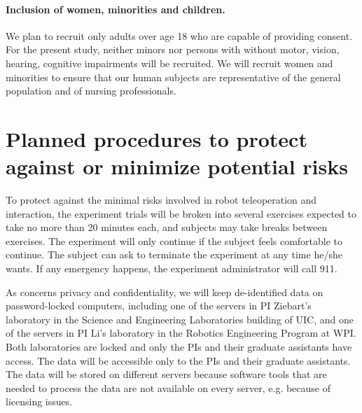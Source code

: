 \paragraph{Inclusion of women, minorities and children.}
We plan to recruit only adults over age 18 who are capable of providing consent. For the present study, neither minors nor persons with without motor, vision, hearing, cognitive impairments will be recruited. We will recruit women and minorities to ensure that our human subjects are representative of the general population and of nursing professionals. 


\section{Planned procedures to protect against or minimize potential risks}\label{sec:protection}
To protect against the minimal risks involved in robot teleoperation and interaction, the experiment trials will be broken into several exercises expected to take no more than 20 minutes each, and subjects may take breaks between exercises. The experiment will only continue if the subject feels comfortable to continue. The subject can ask to terminate the experiment at any time he/she wants. If any emergency happens, the experiment administrator will call 911.

As concerns privacy and confidentiality, we will keep de-identified data on password-locked computers, including one of the servers in PI Ziebart's laboratory in the Science and Engineering Laboratories building of UIC, and one of the servers in PI Li's laboratory in the Robotics Engineering Program at WPI. Both laboratories are locked and only the PIs and their graduate assistants have access. The data will be accessible only to the PIs and their graduate assistants. The data will be stored on different servers because software tools that are needed to process the data are not available on every server, e.g. because of licensing issues.